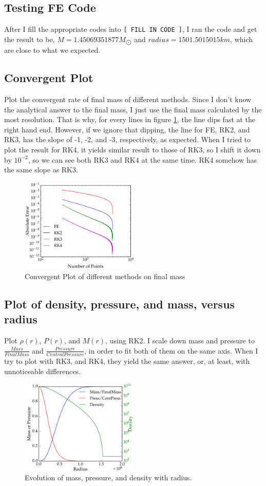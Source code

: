 \documentclass[11pt,letterpaper]{article}
\begin{document}
\subsection{Testing FE Code}
After I fill the appropriate codes into \texttt{[ FILL IN CODE ]}, I ran the code and get the result to be, $M = 1.45069351877 M_{\bigodot}$ and $radius = 1501.5015015 km$, which are close to what we expected.


\subsection{Convergent Plot}

Plot the convergent rate of final mass of different methods. Since I don't know the analytical answer to the final mass, I just use the final mass calculated by the most resolution. That is why, for every lines in figure \ref{fig:ConvergePlot}, the line dips fast at the right hand end. However, if we ignore that dipping, the line for FE, RK2, and RK3, has the slope of -1, -2, and -3, respectively, as expected. When I tried to plot the result for RK4, it yields similar result to those of RK3, so I shift it down by $10^{-2}$, so we can see both RK3 and RK4 at the same time. RK4 somehow has the same slope as RK3.

\begin{figure}[h!]
	\centering
	\includegraphics[width=0.5\textwidth]{ConvergePlot}
	\caption{Convergent Plot of different methods on final mass}
	\label{fig:ConvergePlot}
\end{figure}

\subsection{Plot of density, pressure, and mass, versus radius}

Plot $\rho (r)$, $P(r)$, and $M(r)$, using RK2. I scale down mass and pressure to $\frac{Mass}{Final Mass}$ and $\frac{Pressure}{Central Pressure}$, in order to fit both of them on the same axis. When I try to plot with RK3,  and RK4, they yield the same answer, or, at least, with unnoticeable differences.

\begin{figure}[h!]
	\centering
	\includegraphics[width=0.5\textwidth]{Evolution}
	\caption{Evolution of mass, pressure, and density with radius.}
	\label{fig:Evolution}
\end{figure}
	
\end{document}
